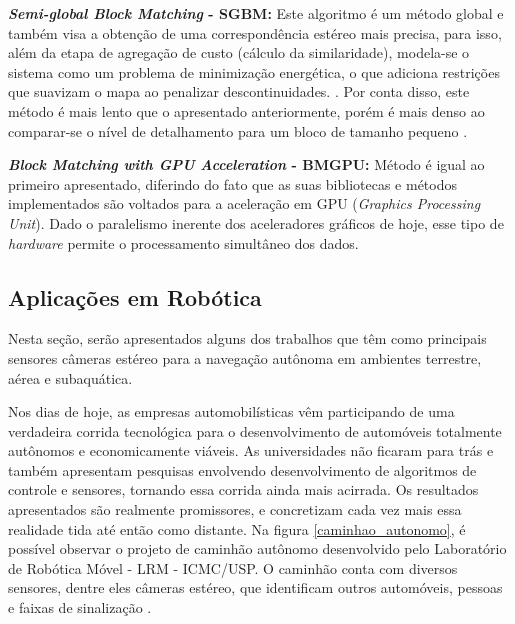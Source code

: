 \textbf{\textit{Semi-global Block Matching} - SGBM:} Este algoritmo é um método global e também visa a obtenção de uma correspondência estéreo mais precisa, para isso, além da etapa de agregação de custo (cálculo da similaridade), modela-se o sistema como um problema de minimização energética, o que adiciona restrições que suavizam o mapa ao penalizar descontinuidades.  \cite{JunhwanKim2003}. Por conta disso, este método é mais lento que o apresentado anteriormente, porém é mais denso ao comparar-se o nível de detalhamento para um bloco de tamanho pequeno \cite{Hirschmuller2008}.

\textbf{\textit{Block Matching with GPU Acceleration} - BMGPU:} Método é igual ao primeiro apresentado, diferindo do fato que as suas bibliotecas e métodos implementados são voltados para a aceleração em GPU (\textit{Graphics Processing Unit}). Dado o paralelismo inerente dos aceleradores gráficos de hoje, esse tipo de \textit{hardware} permite o processamento simultâneo dos dados. 


\subsection{Aplicações em Robótica}
\label{aplicacoes_robotica}
Nesta seção, serão apresentados alguns dos trabalhos que têm como principais sensores câmeras estéreo para a navegação autônoma em ambientes terrestre, aérea e subaquática.

Nos dias de hoje, as empresas automobilísticas vêm participando de uma verdadeira corrida tecnológica para o desenvolvimento de automóveis totalmente autônomos e economicamente viáveis. As universidades não ficaram para trás e também apresentam pesquisas envolvendo desenvolvimento de algoritmos de controle e sensores, tornando essa corrida ainda mais acirrada. Os resultados apresentados são realmente promissores, e concretizam cada vez mais essa realidade tida até então como distante. Na figura \ref{caminhao_autonomo}, é possível observar o projeto de caminhão autônomo desenvolvido pelo Laboratório de Robótica Móvel - LRM - ICMC/USP. O caminhão conta com diversos sensores, dentre eles câmeras estéreo, que identificam outros automóveis, pessoas e faixas de sinalização \cite{ShinzatoP}. 


